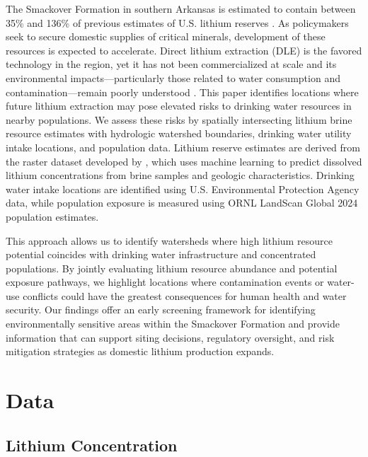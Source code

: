\documentclass{article}
\begin{document}

The Smackover Formation in southern Arkansas is estimated to contain between 35\% and 136\% of previous estimates of U.S. lithium reserves \cite{knierim2024evaluation}. As policymakers seek to secure domestic supplies of critical minerals, development of these resources is expected to accelerate. Direct lithium extraction (DLE) is the favored technology in the region, yet it has not been commercialized at scale and its environmental impacts—particularly those related to water consumption and contamination—remain poorly understood \cite{malone2026geotechnical}. This paper identifies locations where future lithium extraction may pose elevated risks to drinking water resources in nearby populations.
We assess these risks by spatially intersecting lithium brine resource estimates with hydrologic watershed boundaries, drinking water utility intake locations, and population data. Lithium reserve estimates are derived from the raster dataset developed by \cite{knierim2024evaluation}, which uses machine learning to predict dissolved lithium concentrations from brine samples and geologic characteristics. Drinking water intake locations are identified using U.S. Environmental Protection Agency data, while population exposure is measured using ORNL LandScan Global 2024 population estimates.

This approach allows us to identify watersheds where high lithium resource potential coincides with drinking water infrastructure and concentrated populations. By jointly evaluating lithium resource abundance and potential exposure pathways, we highlight locations where contamination events or water-use conflicts could have the greatest consequences for human health and water security. Our findings offer an early screening framework for identifying environmentally sensitive areas within the Smackover Formation and provide information that can support siting decisions, regulatory oversight, and risk mitigation strategies as domestic lithium production expands.

\section{Data}

\subsection{Lithium Concentration}
\end{document}
